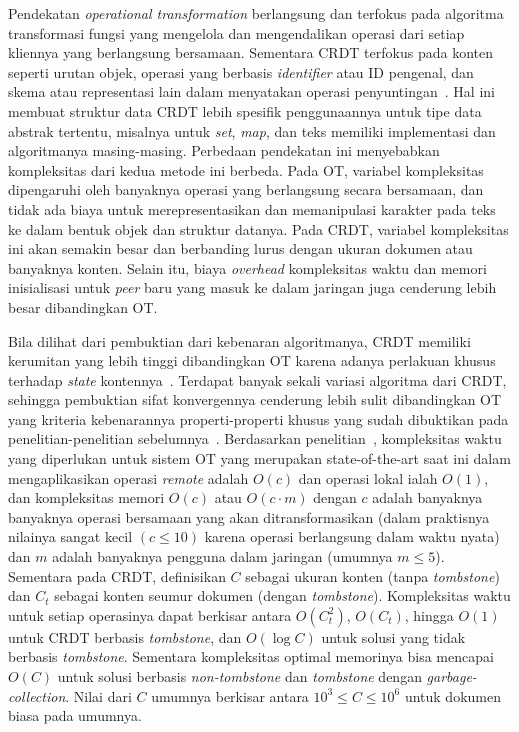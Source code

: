 Pendekatan \textit{operational transformation} berlangsung dan terfokus pada algoritma transformasi fungsi yang mengelola dan mengendalikan operasi dari setiap kliennya yang berlangsung bersamaan. Sementara CRDT terfokus pada konten seperti urutan objek, operasi yang berbasis \textit{identifier} atau ID pengenal, dan skema atau representasi lain dalam menyatakan operasi penyuntingan~\citep{Sun2019Second, Sun2019First}. Hal ini membuat struktur data CRDT lebih spesifik penggunaannya untuk tipe data abstrak tertentu, misalnya untuk \textit{set}, \textit{map}, dan teks memiliki implementasi dan algoritmanya masing-masing. Perbedaan pendekatan ini menyebabkan kompleksitas dari kedua metode ini berbeda. Pada OT, variabel kompleksitas dipengaruhi oleh banyaknya operasi yang berlangsung secara bersamaan, dan tidak ada biaya untuk merepresentasikan dan memanipulasi karakter pada teks ke dalam bentuk objek dan struktur datanya. Pada CRDT, variabel kompleksitas ini akan semakin besar dan berbanding lurus dengan ukuran dokumen atau banyaknya konten. Selain itu, biaya \textit{overhead} kompleksitas waktu dan memori inisialisasi untuk \textit{peer} baru yang masuk ke dalam jaringan juga cenderung lebih besar dibandingkan OT.

Bila dilihat dari pembuktian dari kebenaran algoritmanya, CRDT memiliki kerumitan yang lebih tinggi dibandingkan OT karena adanya perlakuan khusus terhadap \textit{state} kontennya~\citep{Sun2019Second}. Terdapat banyak sekali variasi algoritma dari CRDT, sehingga pembuktian sifat konvergennya cenderung lebih sulit dibandingkan OT yang kriteria kebenarannya properti-properti khusus yang sudah dibuktikan pada penelitian-penelitian sebelumnya~\citep{OTOverview1, Sun2004, oster2005real}. Berdasarkan penelitian~\cite{Sun2019Second}, kompleksitas waktu yang diperlukan untuk sistem OT yang merupakan {state-of-the-art} saat ini dalam mengaplikasikan operasi \textit{remote} adalah $O(c)$ dan operasi lokal ialah $O(1)$, dan kompleksitas memori $O(c)$ atau $O(c \cdot m)$ dengan $c$ adalah banyaknya banyaknya operasi bersamaan yang akan ditransformasikan (dalam praktisnya nilainya sangat kecil $(c \leq 10)$ karena operasi berlangsung dalam waktu nyata) dan $m$ adalah banyaknya pengguna dalam jaringan (umumnya $m \leq 5$). Sementara pada CRDT, definisikan $C$ sebagai ukuran konten (tanpa \textit{tombstone}) dan $C_t$ sebagai konten seumur dokumen (dengan \textit{tombstone}). Kompleksitas waktu untuk setiap operasinya dapat berkisar antara $O(C_{t}^{2})$, $O(C_{t})$, hingga $O(1)$ untuk CRDT berbasis \textit{tombstone}, dan $O(\log C)$ untuk solusi yang tidak berbasis \textit{tombstone}. Sementara kompleksitas optimal memorinya bisa mencapai $O(C)$ untuk solusi berbasis \textit{non-tombstone} dan \textit{tombstone} dengan \textit{garbage-collection}. Nilai dari $C$ umumnya berkisar antara $10^3 \leq C \leq 10^6$ untuk dokumen biasa pada umumnya.

